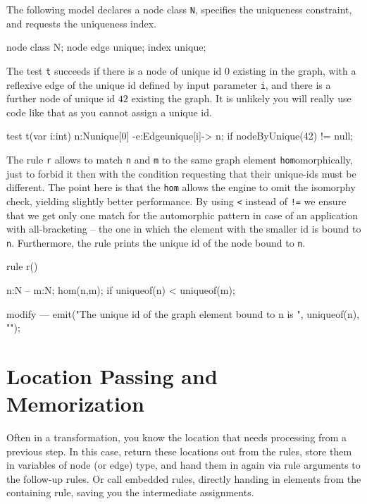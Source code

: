 \begin{example}

The following model declares a node class \texttt{N}, specifies the uniqueness constraint, and requests the uniqueness index.
 
\begin{grgen}
node class N;
node edge unique;
index unique;
\end{grgen}

The test \texttt{t} succeeds if there is a node of unique id $0$ existing in the graph, with a reflexive edge of the unique id defined by input parameter \texttt{i}, and there is a further node of unique id $42$ existing the graph. It is unlikely you will really use code like that as you cannot assign a unique id.

\begin{grgen}
test t(var i:int) {
  n:N{unique[0]} -e:Edge{unique[i]}-> n;
  if{ nodeByUnique(42) != null; }
}
\end{grgen}

The rule \texttt{r} allows to match \texttt{n} and \texttt{m} to the same graph element \texttt{hom}omorphically, just to forbid it then with the condition requesting that their unique-ids must be different. The point here is that the \texttt{hom} allows the engine to omit the isomorphy check, yielding slightly better performance. By using \verb#<# instead of \verb#!=# we ensure that we get only one match for the automorphic pattern in case of an application with all-bracketing -- the one in which the element with the smaller id is bound to \texttt{n}. Furthermore, the rule prints the unique id of the node bound to \texttt{n}.

\begin{grgen}
rule r() {
  n:N -- m:N;
  hom(n,m);
  if{ uniqueof(n) < uniqueof(m); }
		
  modify {
  ---
    emit("The unique id of the graph element bound to n is ", uniqueof(n), "\n");
  }
}
\end{grgen}

\end{example}


\section{Location Passing and Memorization}
Often in a transformation, you know the location that needs processing from a previous step.
In this case, return these locations out from the rules, store them in variables of node (or edge) type, and hand them in again via rule arguments to the follow-up rules.
Or call embedded rules, directly handing in elements from the containing rule, saving you the intermediate assignments.

